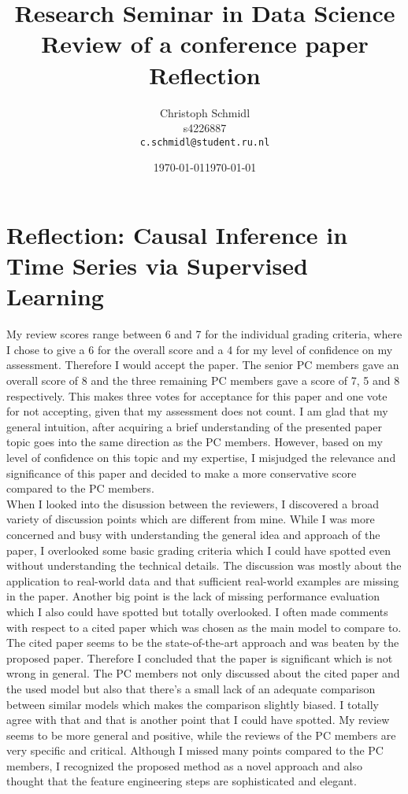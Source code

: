 \documentclass[a4paper]{article}
\title{Research Seminar in Data Science\\Review of a conference paper\\Reflection}
\author{
  Christoph Schmidl\\ s4226887\\      \texttt{c.schmidl@student.ru.nl}
}
\date{\today}
\date{\today}
\begin{document}
\maketitle





\section{Reflection: Causal Inference in Time Series via Supervised Learning}

My review scores range between 6 and 7 for the individual grading criteria, where I chose to give a 6 for the overall score and a 4 for my level of confidence on my assessment. Therefore I would accept the paper. The senior PC members gave an overall score of 8 and the three remaining PC members gave a score of 7, 5 and 8 respectively. This makes three votes for acceptance for this paper and one vote for not accepting, given that my assessment does not count. I am glad that my general intuition, after acquiring a brief understanding of the presented paper topic goes into the same direction as the PC members. However, based on my level of confidence on this topic and my expertise, I misjudged the relevance and significance of this paper and decided to make a more conservative score compared to the PC members.\\
When I looked into the disussion between the reviewers, I discovered a broad variety of discussion points which are different from mine. While I was more concerned and busy with understanding the general idea and approach of the paper, I overlooked some basic grading criteria which I could have spotted even without understanding the technical details. The discussion was mostly about the application to real-world data and that sufficient real-world examples are missing in the paper. Another big point is the lack of missing performance evaluation which I also could have spotted but totally overlooked. I often made comments with respect to a cited paper which was chosen as the main model to compare to. The cited paper seems to be the state-of-the-art approach and was beaten by the proposed paper. Therefore I concluded that the paper is significant which is not wrong in general. The PC members not only discussed about the cited paper and the used model but also that there's a small lack of an adequate comparison between similar models which makes the comparison slightly biased. I totally agree with that and that is another point that I could have spotted. My review seems to be more general and positive, while the reviews of the PC members are very specific and critical. Although I missed many points compared to the PC members, I recognized the proposed method as a novel approach and also thought that the feature engineering steps are sophisticated and elegant.
\end{document}

